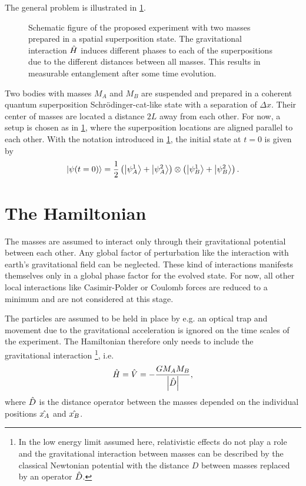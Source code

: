 The general problem is illustrated in \cref{fig:2:simple-problem}.
\begin{figure}[!htbp]
  \centering
  \def\svgwidth{\textwidth}
  
  \caption{Schematic figure of the proposed experiment with two masses prepared in a spatial superposition state. The gravitational interaction $\hat{H}$ induces different phases to each of the superpositions due to the different distances between all masses. This results in measurable entanglement after some time evolution.}
  \label{fig:2:simple-problem}
\end{figure}
Two bodies with masses $M_A$ and $M_B$ are suspended and prepared in a coherent quantum superposition Schrödinger-cat-like state with a separation of $\Delta x$.
Their center of masses are located a distance $2L$ away from each other.
For now, a setup is chosen as in \cref{fig:2:simple-problem}, where the superposition locations are aligned parallel to each other.
With the notation introduced in \cref{fig:2:simple-problem}, the initial state at $t=0$ is given by
\begin{equation}\label{eq:2:initial-state}
  \ket{\psi(t=0)} = \frac{1}{2}\left( \ket{\psi_A^1} + \ket{\psi_A^2} \right) \otimes \left( \ket{\psi_B^1} + \ket{\psi_B^2} \right) .
\end{equation}



\section{The Hamiltonian}
The masses are assumed to interact only through their gravitational potential between each other. Any global factor of perturbation like the interaction with earth's gravitational field can be neglected. These kind of interactions manifests themselves only in a global phase factor for the evolved state.
For now, all other local interactions like Casimir-Polder \cite{Casimir_1948} or Coulomb forces are reduced to a minimum and are not considered at this stage.

The particles are assumed to be held in place by e.g. an optical trap and movement due to the gravitational acceleration is ignored on the time scales of the experiment. The Hamiltonian therefore only needs to include the gravitational interaction \footnote{In the low energy limit assumed here, relativistic effects do not play a role and the gravitational interaction between masses can be described by the classical Newtonian potential with the distance $D$ between masses replaced by an operator $\hat{D}$.}, i.e.
\begin{equation}\label{eq:2:hamiltonian}
  \hat{H} = \hat{V} = -\frac{G M_A M_B}{\left\lvert\hat{D}\right\rvert},
\end{equation}
where $\hat{D}$ is the distance operator between the masses depended on the individual positions $\hat{x_A}$ and $\hat{x_B}$.

